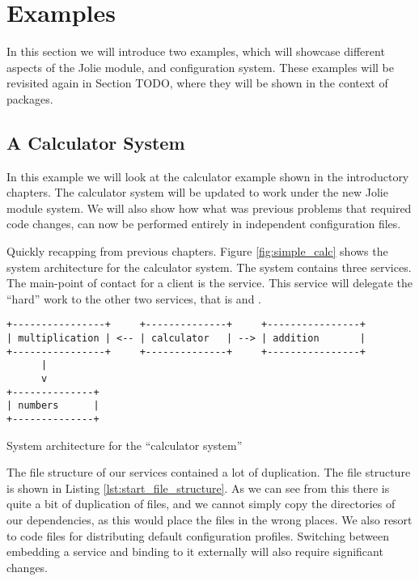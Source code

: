 \section{Examples}
\label{sec:module_examples}

In this section we will introduce two examples, which will showcase different
aspects of the Jolie module, and configuration system. These examples will be
revisited again in Section TODO, where they will be shown in the context of
packages.

\subsection{A Calculator System}

In this example we will look at the calculator example shown in the
introductory chapters. The calculator system will be updated to work under the
new Jolie module system. We will also show how what was previous problems that
required code changes, can now be performed entirely in independent
configuration files.

Quickly recapping from previous chapters.  Figure \ref{fig:simple_calc} shows
the system architecture for the calculator system. The system contains three
services. The main-point of contact for a client is the 
service. This service will delegate the ``hard'' work to the other two
services, that is  and .

\begin{listing}[H]
\begin{verbatim}
+----------------+     +--------------+     +----------------+
| multiplication | <-- | calculator   | --> | addition       |
+----------------+     +--------------+     +----------------+
      |
      v
+--------------+
| numbers      |
+--------------+
\end{verbatim}
\caption{System architecture for the ``calculator system''}
\label{fig:simple_calc}
\end{listing}

The file structure of our services contained a lot of duplication. The file
structure is shown in Listing \ref{lst:start_file_structure}. As we can see
from this there is quite a bit of duplication of files, and we cannot simply
copy the directories of our dependencies, as this would place the files in the
wrong places. We also resort to code files for distributing default
configuration profiles. Switching between embedding a service and binding to it
externally will also require significant changes.

